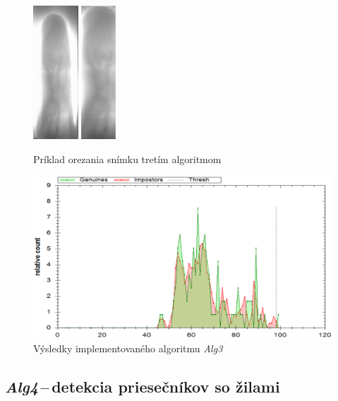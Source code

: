\documentclass[11pt,a4paper]{article}
\begin{document}
\vfill
\begin{figure}[ht!]
	\centering
	\includegraphics[height=5cm]{fig/alg3_in.eps}
	\includegraphics[height=5cm]{fig/alg3_out.eps}
	\caption{\label{fig:alg_out} Príklad orezania snímku tretím algoritmom}
\end{figure}

\vfill

\begin{figure}[ht!]
	\centering
		\includegraphics[width=17cm]{fig/alg3.eps}
	\caption{\label{fig:alg3} Výsledky implementovaného algoritmu \emph{Alg3}}
\end{figure}
\vfill

\clearpage
\subsection{\emph{Alg4}\,--\,detekcia priesečníkov so žilami} \label{alg4}
\end{document}
